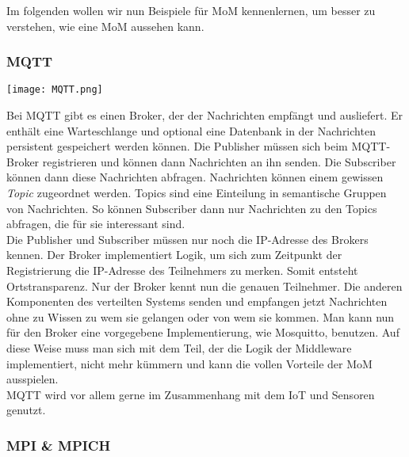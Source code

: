 Im folgenden wollen wir nun Beispiele für MoM kennenlernen, um besser zu verstehen, wie eine MoM aussehen kann.

\subsubsection{MQTT}

\texttt{[image: MQTT.png]}

Bei MQTT gibt es einen Broker, der der Nachrichten empfängt und ausliefert. Er enthält eine Warteschlange und optional eine Datenbank in der Nachrichten persistent gespeichert werden können. Die Publisher müssen sich beim MQTT-Broker registrieren und können dann Nachrichten an ihn senden. Die Subscriber können dann diese Nachrichten abfragen. Nachrichten können einem gewissen \textit{Topic} zugeordnet werden. Topics sind eine Einteilung in semantische Gruppen von Nachrichten. So können Subscriber dann nur Nachrichten zu den Topics abfragen, die für sie interessant sind.\\
Die Publisher und Subscriber müssen nur noch die IP-Adresse des Brokers kennen. Der Broker implementiert Logik, um sich zum Zeitpunkt der Registrierung die IP-Adresse des Teilnehmers zu merken. Somit entsteht Ortstransparenz. Nur der Broker kennt nun die genauen Teilnehmer. Die anderen Komponenten des verteilten Systems senden und empfangen jetzt Nachrichten ohne zu Wissen zu wem sie gelangen oder von wem sie kommen. Man kann nun für den Broker eine vorgegebene Implementierung, wie Mosquitto, benutzen. Auf diese Weise muss man sich mit dem Teil, der die Logik der Middleware implementiert, nicht mehr kümmern und kann die vollen Vorteile der MoM ausspielen.\\
MQTT wird vor allem gerne im Zusammenhang mit dem IoT und Sensoren genutzt.

\subsubsection{MPI \& MPICH}

